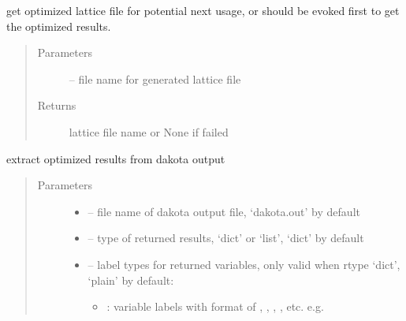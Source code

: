 \documentclass[letterpaper,10pt,english]{sphinxmanual}
\begin{document}
\begin{fulllineitems}
\begin{fulllineitems}
\end{fulllineitems}


\begin{fulllineitems}
\label{\detokenize{src/apidocs/genopt:genopt.DakotaOC.get_opt_latfile}}
get optimized lattice file for potential next usage,
 or  should be evoked first to get the 
optimized results.
\begin{quote}\begin{description}
\item[{Parameters}] \leavevmode
{} -- file name for generated lattice file

\item[{Returns}] \leavevmode
lattice file name or None if failed

\end{description}\end{quote}

\end{fulllineitems}


\begin{fulllineitems}
\label{\detokenize{src/apidocs/genopt:genopt.DakotaOC.get_opt_results}}
extract optimized results from dakota output
\begin{quote}\begin{description}
\item[{Parameters}] \leavevmode\begin{itemize}
\item {} 
 -- file name of dakota output file, 
`dakota.out' by default

\item {} 
 -- type of returned results, `dict' or `list', 
`dict' by default

\item {} 
 -- 
label types for returned variables, only valid when rtype `dict', 
`plain' by default:
\begin{itemize}
\item {} 
: variable labels with format of , , , , etc.
e.g. 


\end{itemize}
\end{itemize}
\end{description}
\end{quote}
\end{fulllineitems}
\end{fulllineitems}
\end{document}
